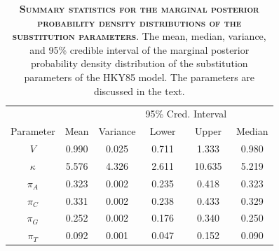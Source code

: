 \documentclass{svmult}
\begin{document}
\begin{table}[b]
\centering
\caption{\textbf{\textsc{Summary statistics for the marginal posterior probability density distributions of the substitution parameters}}.
The mean, median, variance, and 95\% credible interval of the marginal posterior probability density distribution of the substitution
parameters of the HKY85 model. The parameters are discussed in the text.}
\begin{tabular}{cccccc}
                    &             &                  & \multicolumn{2}{c}{95\% Cred. Interval} & \\ \cline{4-5}
Parameter & Mean & Variance & Lower & Upper & Median \\ \hline
$V$           &  0.990  &  0.025  &  0.711   & 1.333  &  0.980   \\
$\kappa$ &  5.576  &  4.326 &  2.611 &  10.635  &  5.219   \\
$\pi_A$    &  0.323  &  0.002  &  0.235  &  0.418  &  0.323   \\
$\pi_C$    &  0.331  &  0.002  &  0.238  &  0.433 &  0.329   \\
$\pi_G$    &  0.252  &  0.002  &  0.176  &  0.340 &   0.250   \\
$\pi_T$     &  0.092  &  0.001 &   0.047  &  0.152 &  0.090   \\ \hline
\end{tabular}

\label{tab2}
\end{table}
\end{document}
